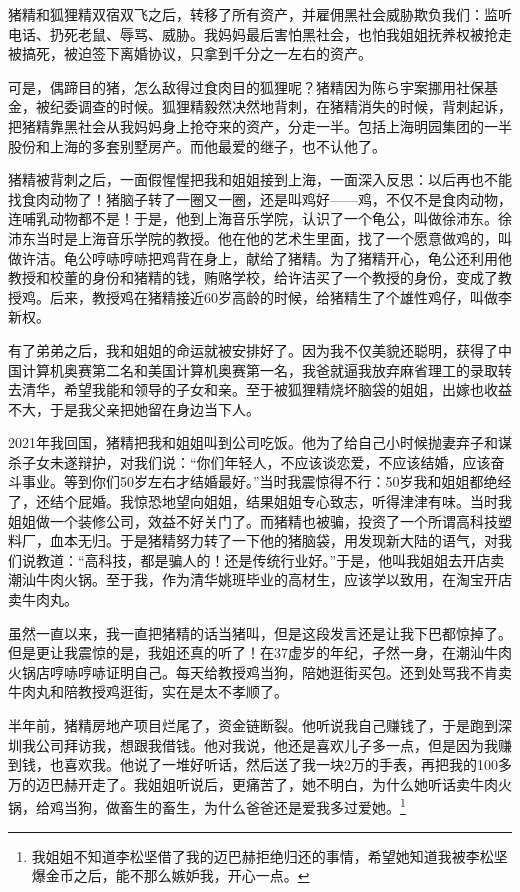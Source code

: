 猪精和狐狸精双宿双飞之后，转移了所有资产，并雇佣黑社会威胁欺负我们：监听电话、扔死老鼠、辱骂、威胁。我妈妈最后害怕黑社会，也怕我姐姐抚养权被抢走被搞死，被迫签下离婚协议，只拿到千分之一左右的资产。

可是，偶蹄目的猪，怎么敌得过食肉目的狐狸呢？猪精因为陈ら宇案挪用社保基金，被纪委调查的时候。狐狸精毅然决然地背刺，在猪精消失的时候，背刺起诉，把猪精靠黑社会从我妈妈身上抢夺来的资产，分走一半。包括上海明园集团的一半股份和上海的多套别墅房产。而他最爱的继子，也不认他了。

猪精被背刺之后，一面假惺惺把我和姐姐接到上海，一面深入反思：以后再也不能找食肉动物了！猪脑子转了一圈又一圈，还是叫鸡好——鸡，不仅不是食肉动物，连哺乳动物都不是！于是，他到上海音乐学院，认识了一个龟公，叫做徐沛东。徐沛东当时是上海音乐学院的教授。他在他的艺术生里面，找了一个愿意做鸡的，叫做许洁。龟公哼哧哼哧把鸡背在身上，献给了猪精。为了猪精开心，龟公还利用他教授和校董的身份和猪精的钱，贿赂学校，给许洁买了一个教授的身份，变成了教授鸡。后来，教授鸡在猪精接近60岁高龄的时候，给猪精生了个雄性鸡仔，叫做李新权。

有了弟弟之后，我和姐姐的命运就被安排好了。因为我不仅美貌还聪明，获得了中国计算机奥赛第二名和美国计算机奥赛第一名，我爸就逼我放弃麻省理工的录取转去清华，希望我能和领导的子女和亲。至于被狐狸精烧坏脑袋的姐姐，出嫁也收益不大，于是我父亲把她留在身边当下人。

2021年我回国，猪精把我和姐姐叫到公司吃饭。他为了给自己小时候抛妻弃子和谋杀子女未遂辩护，对我们说：``你们年轻人，不应该谈恋爱，不应该结婚，应该奋斗事业。等到你们50岁左右才结婚最好。''当时我震惊得不行：50岁我和姐姐都绝经了，还结个屁婚。我惊恐地望向姐姐，结果姐姐专心致志，听得津津有味。当时我姐姐做一个装修公司，效益不好关门了。而猪精也被骗，投资了一个所谓高科技塑料厂，血本无归。于是猪精努力转了一下他的猪脑袋，用发现新大陆的语气，对我们说教道：``高科技，都是骗人的！还是传统行业好。''于是，他叫我姐姐去开店卖潮汕牛肉火锅。至于我，作为清华姚班毕业的高材生，应该学以致用，在淘宝开店卖牛肉丸。

虽然一直以来，我一直把猪精的话当猪叫，但是这段发言还是让我下巴都惊掉了。但是更让我震惊的是，我姐还真的听了！在37虚岁的年纪，孑然一身，在潮汕牛肉火锅店哼哧哼哧证明自己。每天给教授鸡当狗，陪她逛街买包。还到处骂我不肯卖牛肉丸和陪教授鸡逛街，实在是太不孝顺了。

半年前，猪精房地产项目烂尾了，资金链断裂。他听说我自己赚钱了，于是跑到深圳我公司拜访我，想跟我借钱。他对我说，他还是喜欢儿子多一点，但是因为我赚到钱，也喜欢我。他说了一堆好听话，然后送了我一块2万的手表，再把我的100多万的迈巴赫开走了。我姐姐听说后，更痛苦了，她不明白，为什么她听话卖牛肉火锅，给鸡当狗，做畜生的畜生，为什么爸爸还是爱我多过爱她。\footnote{我姐姐不知道李松坚借了我的迈巴赫拒绝归还的事情，希望她知道我被李松坚爆金币之后，能不那么嫉妒我，开心一点。}

